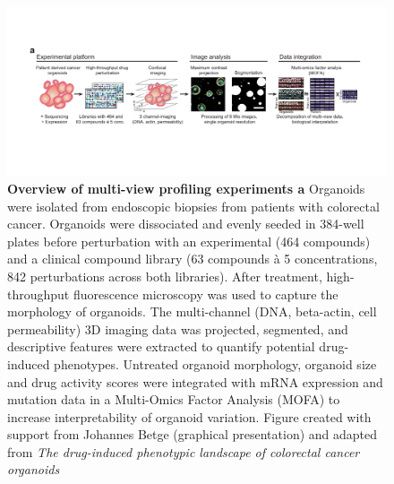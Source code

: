 \begin{flushleft}
\begin{figure}[h]
\centering
\includegraphics[width=\textwidth,
                height=\textheight,
                keepaspectratio]{figures/promise/pdf/fig_1_1.pdf}
\caption[Overview of multi-view profiling experiments]{\textbf{Overview of multi-view profiling experiments a} Organoids were isolated from endoscopic biopsies from patients with colorectal cancer. Organoids were dissociated and evenly seeded in 384-well plates before perturbation with an experimental (464 compounds) and a clinical compound library (63 compounds à 5 concentrations, 842 perturbations across both libraries). After treatment, high-throughput fluorescence microscopy was used to capture the morphology of organoids.  The multi-channel (DNA, beta-actin, cell permeability) 3D imaging data was projected, segmented, and descriptive features were extracted to quantify potential drug-induced phenotypes. Untreated organoid morphology, organoid size and drug activity scores were integrated with mRNA expression and mutation data in a Multi-Omics Factor Analysis (MOFA) to increase interpretability of organoid variation. Figure created with support from Johannes Betge (graphical presentation) and adapted from \textit{The drug-induced phenotypic landscape of colorectal cancer organoids} \citep{Betge2022-kr}}
\label{fig_130}
\end{figure}


\end{flushleft}
